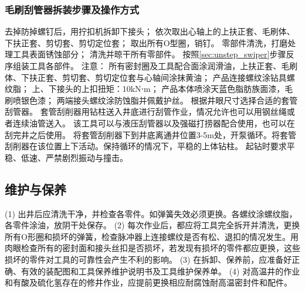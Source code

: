 \subsubsection{毛刷刮管器拆装步骤及操作方式}
\label{sec:unstep_swiper}
	去掉防掉螺钉后，用拧扣机拆卸下接头；
	依次取出心轴上的上扶正套、毛刷体、下扶正套、剪切套、剪切定位套；
	取出所有O型圈，销钉。
	零部件清洗，打磨处理工具表面锈蚀部分；
	清洗并晾干所有零部件。
按照\ref{sec:unstep_swiper}步骤反序组装工具各部件。
注意：
	所有密封圈及工具配合面涂润滑油，上扶正套、毛刷体、下扶正套、剪切套、剪切定位套与心轴间涂抹黄油；
	产品连接螺纹涂钻具螺纹脂；
	上、下接头的上扣扭矩：10kN⋅m；
	产品本体喷涂天蓝色脂肪族面漆，毛刷喷银色漆；
	两端接头螺纹涂防蚀脂并佩戴护丝。
	根据井眼尺寸选择合适的套管刮管器。
	套管刮削器用钻柱送入井底进行刮管作业，情况允许也可以用钢丝绳或者连续油管送入。
	该工具可以与液压刮管器以及强磁打捞器配合使用，也可以在刮完井之后使用。
	将套管刮削器下到井底离通井位置3-5m处，开泵循环。将套管刮削器在该位置上下活动。保持循环的情况下，平稳的上体钻柱。
	起钻时要求平稳、低速、严禁剧烈振动与撞击。

\subsection{维护与保养}

(1) 出井后应清洗干净，并检查各零件。如弹簧失效必须更换。各螺纹涂螺纹脂，各零件涂油，放阴干处保存。
(2) 每次作业后，都应将工具完全拆开并清洗，更换所有O形圈和损坏的弹簧，检查脉冲器上连接螺纹是否有松、退扣的情况发生。用肉眼检查所有的密封面和接头丝扣是否损坏，若发现有损坏的零件都应更换，这些损坏的零件对工具的可靠性会产生不利的影响。
(3) 在拆卸、保养前，应准备好正确、有效的装配图和工具保养维护说明书及工具维护保养单。
(4) 对高温井的作业和有酸及硫化氢存在的修井作业，应提前更换相应耐腐蚀耐高温密封件和配件。


















